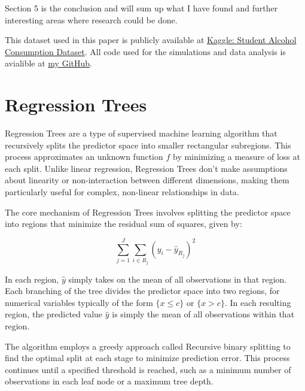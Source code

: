 \documentclass[12pt]{article}
\begin{document}
Section 5 is the conclusion and will sum up what I have found and further interesting areas where research could be done.

This dataset used in this paper is publicly available at \href{https://www.kaggle.com/datasets/uciml/student-alcohol-consumption}{Kaggle: Student Alcohol Consumption Dataset}. All code used for the simulations and data analysis is avialible at \href{https://github.com/Tim2othy/wissenschaftliches-arbeiten}{my GitHub}.



\section{Regression Trees}

Regression Trees are a type of supervised machine learning algorithm that recursively splits the predictor space into smaller rectangular subregions. This process approximates an unknown function $f$ by minimizing a measure of loss at each split. Unlike linear regression, Regression Trees don't make assumptions about linearity or non-interaction between different dimensions, making them particularly useful for complex, non-linear relationships in data.

The core mechanism of Regression Trees involves splitting the predictor space into regions that minimize the residual sum of squares, given by:

\begin{equation}
    \sum_{j=1}^{J} \sum_{i \in R_j} ( y_i- \hat{ y}_{R_j} )^2
\end{equation}



In each region, $\hat{y}$ simply takes on the mean of all observations in that region.
Each branching of the tree divides the predictor space into two regions, for numerical variables typically of the form $\{x \le c\}$ or $\{x > c\}$. In each resulting region, the predicted value $\hat{y}$ is simply the mean of all observations within that region.

The algorithm employs a greedy approach called Recursive binary splitting to find the optimal split at each stage to minimize prediction error. This process continues until a specified threshold is reached, such as a minimum number of observations in each leaf node or a maximum tree depth.
\end{document}
